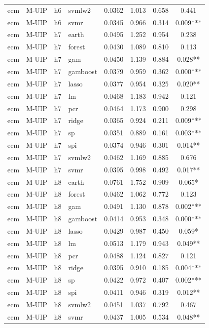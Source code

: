 \begin{ThreePartTable}
\begin{longtable}[t]{llclcccc}
ecm & M-UIP & h6 & svmlw2 & 0.0362 & 1.013 & 0.658 & 0.441\\
ecm & M-UIP & h6 & svmr & 0.0345 & 0.966 & 0.314 & 0.009***\\
\addlinespace
ecm & M-UIP & h7 & earth & 0.0495 & 1.252 & 0.954 & 0.238\\
ecm & M-UIP & h7 & forest & 0.0430 & 1.089 & 0.810 & 0.113\\
ecm & M-UIP & h7 & gam & 0.0450 & 1.139 & 0.884 & 0.028**\\
ecm & M-UIP & h7 & gamboost & 0.0379 & 0.959 & 0.362 & 0.000***\\
ecm & M-UIP & h7 & lasso & 0.0377 & 0.954 & 0.325 & 0.020**\\
ecm & M-UIP & h7 & lm & 0.0468 & 1.183 & 0.942 & 0.121\\
ecm & M-UIP & h7 & pcr & 0.0464 & 1.173 & 0.900 & 0.298\\
ecm & M-UIP & h7 & ridge & 0.0365 & 0.924 & 0.211 & 0.009***\\
ecm & M-UIP & h7 & sp & 0.0351 & 0.889 & 0.161 & 0.003***\\
ecm & M-UIP & h7 & spi & 0.0374 & 0.946 & 0.301 & 0.014**\\
ecm & M-UIP & h7 & svmlw2 & 0.0462 & 1.169 & 0.885 & 0.676\\
ecm & M-UIP & h7 & svmr & 0.0395 & 0.998 & 0.492 & 0.017**\\
\addlinespace
ecm & M-UIP & h8 & earth & 0.0761 & 1.752 & 0.909 & 0.065*\\
ecm & M-UIP & h8 & forest & 0.0462 & 1.062 & 0.772 & 0.123\\
ecm & M-UIP & h8 & gam & 0.0491 & 1.130 & 0.878 & 0.002***\\
ecm & M-UIP & h8 & gamboost & 0.0414 & 0.953 & 0.348 & 0.000***\\
ecm & M-UIP & h8 & lasso & 0.0429 & 0.987 & 0.450 & 0.059*\\
ecm & M-UIP & h8 & lm & 0.0513 & 1.179 & 0.943 & 0.049**\\
ecm & M-UIP & h8 & pcr & 0.0488 & 1.124 & 0.827 & 0.121\\
ecm & M-UIP & h8 & ridge & 0.0395 & 0.910 & 0.185 & 0.004***\\
ecm & M-UIP & h8 & sp & 0.0422 & 0.972 & 0.407 & 0.002***\\
ecm & M-UIP & h8 & spi & 0.0411 & 0.946 & 0.319 & 0.012**\\
ecm & M-UIP & h8 & svmlw2 & 0.0451 & 1.037 & 0.792 & 0.467\\
ecm & M-UIP & h8 & svmr & 0.0437 & 1.005 & 0.534 & 0.048**\\

\end{longtable}
\end{ThreePartTable}

